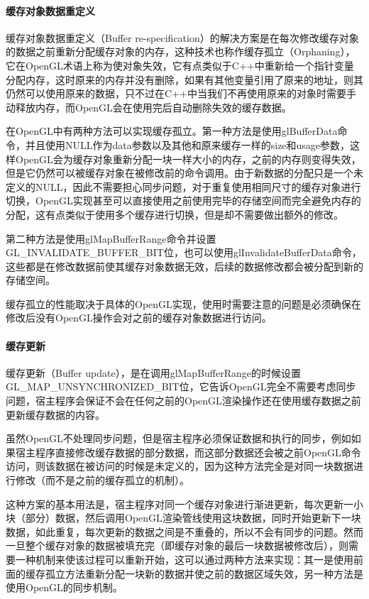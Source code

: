 \paragraph{缓存对象数据重定义}
缓存对象数据重定义（Buffer re-specification）的解决方案是在每次修改缓存对象的数据之前重新分配缓存对象的内存，这种技术也称作缓存孤立（Orphaning），它在OpenGL术语上称为使对象失效，它有点类似于C++中重新给一个指针变量分配内存，这时原来的内存并没有删除，如果有其他变量引用了原来的地址，则其仍然可以使用原来的数据，只不过在C++中当我们不再使用原来的对象时需要手动释放内存，而OpenGL会在使用完后自动删除失效的缓存数据。

在OpenGL中有两种方法可以实现缓存孤立。第一种方法是使用glBufferData命令，并且使用NULL作为data参数以及其他和原来缓存一样的size和usage参数，这样OpenGL会为缓存对象重新分配一块一样大小的内存，之前的内存则变得失效，但是它仍然可以被缓存对象在被修改前的命令调用。由于新数据的分配只是一个未定义的NULL，因此不需要担心同步问题，对于重复使用相同尺寸的缓存对象进行切换，OpenGL实现甚至可以直接使用之前使用完毕的存储空间而完全避免内存的分配，这有点类似于使用多个缓存进行切换，但是却不需要做出额外的修改。

第二种方法是使用glMapBufferRange命令并设置GL\_INVALIDATE\_BUFFER\_BIT位，也可以使用glInvalidateBufferData​命令，这些都是在修改数据前使其缓存对象数据无效，后续的数据修改都会被分配到新的存储空间。

缓存孤立的性能取决于具体的OpenGL实现，使用时需要注意的问题是必须确保在修改后没有OpenGL操作会对之前的缓存对象数据进行访问。




\paragraph{缓存更新}
缓存更新（Buffer update），是在调用glMapBufferRange的时候设置GL\_MAP\_UNSYNCHRONIZED\_BIT位，它告诉OpenGL完全不需要考虑同步问题，宿主程序会保证不会在任何之前的OpenGL渲染操作还在使用缓存数据之前更新缓存数据的内容。

虽然OpenGL不处理同步问题，但是宿主程序必须保证数据和执行的同步，例如如果宿主程序直接修改缓存数据的部分数据，而这部分数据还会被之前OpenGL命令访问，则该数据在被访问的时候是未定义的，因为这种方法完全是对同一块数据进行修改（而不是之前的缓存孤立的机制）。

这种方案的基本用法是，宿主程序对同一个缓存对象进行渐进更新，每次更新一小块（部分）数据，然后调用OpenGL渲染管线使用这块数据，同时开始更新下一块数据，如此重复，每次更新的数据之间是不重叠的，所以不会有同步的问题。然而一旦整个缓存对象的数据被填充完（即缓存对象的最后一块数据被修改后），则需要一种机制来使该过程可以重新开始，这可以通过两种方法来实现：其一是使用前面的缓存孤立方法重新分配一块新的数据并使之前的数据区域失效，另一种方法是使用OpenGL的同步机制。







